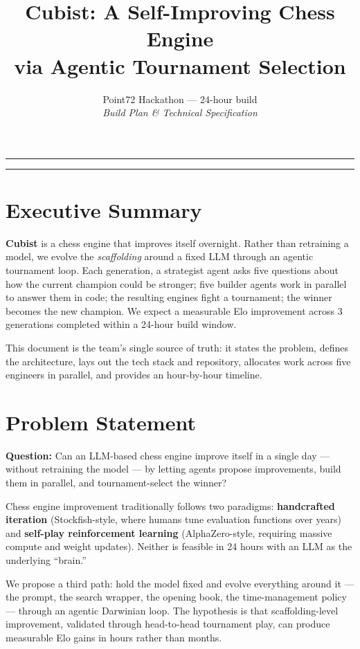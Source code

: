 \documentclass[11pt]{article}
\title{\textbf{Cubist: A Self-Improving Chess Engine\\via Agentic Tournament Selection}}
\author{Point72 Hackathon --- 24-hour build \\ \textit{Build Plan \& Technical Specification}}
\date{}
\begin{document}
\maketitle

\hrule
\vspace{1em}

\tableofcontents
\vspace{1em}
\hrule

\section{Executive Summary}

\textbf{Cubist} is a chess engine that improves itself overnight. Rather than retraining a model, we evolve the \emph{scaffolding} around a fixed LLM through an agentic tournament loop. Each generation, a strategist agent asks five questions about how the current champion could be stronger; five builder agents work in parallel to answer them in code; the resulting engines fight a tournament; the winner becomes the new champion. We expect a measurable Elo improvement across 3 generations completed within a 24-hour build window.

This document is the team's single source of truth: it states the problem, defines the architecture, lays out the tech stack and repository, allocates work across five engineers in parallel, and provides an hour-by-hour timeline.

\section{Problem Statement}

\begin{tcolorbox}[colback=gray!5,colframe=gray!50,arc=2mm]
\textbf{Question:} Can an LLM-based chess engine improve itself in a single day --- without retraining the model --- by letting agents propose improvements, build them in parallel, and tournament-select the winner?
\end{tcolorbox}

Chess engine improvement traditionally follows two paradigms: \textbf{handcrafted iteration} (Stockfish-style, where humans tune evaluation functions over years) and \textbf{self-play reinforcement learning} (AlphaZero-style, requiring massive compute and weight updates). Neither is feasible in 24 hours with an LLM as the underlying ``brain.''

We propose a third path: hold the model fixed and evolve everything around it --- the prompt, the search wrapper, the opening book, the time-management policy --- through an agentic Darwinian loop. The hypothesis is that scaffolding-level improvement, validated through head-to-head tournament play, can produce measurable Elo gains in hours rather than months.
\end{document}
